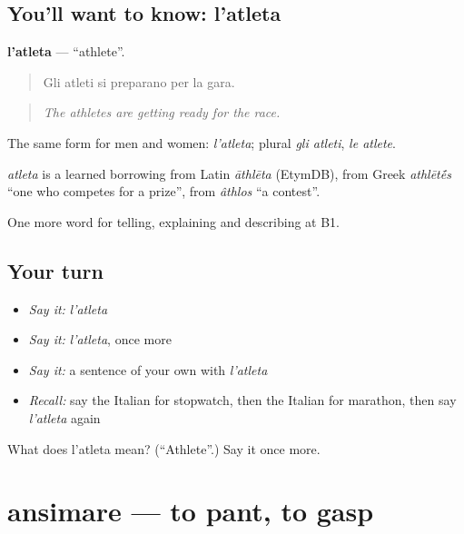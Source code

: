 \subsection*{You'll want to know: l'atleta}
\textbf{l'atleta} — \textquotedblleft{}athlete\textquotedblright{}.

\begin{quote}
Gli atleti si preparano per la gara.
\end{quote}

\begin{quote}
\emph{The athletes are getting ready for the race.}
\end{quote}

The same form for men and women: \emph{l'atleta}; plural \emph{gli atleti}, \emph{le atlete}.

\begin{cousinweb}
\emph{atleta} is a learned borrowing from Latin \emph{āthlēta} (EtymDB), from Greek \emph{athlēt\'{\={e}}s} \textquotedblleft{}one who competes for a prize\textquotedblright{}, from \emph{âthlos} \textquotedblleft{}a contest\textquotedblright{}.
\end{cousinweb}

\begin{grammarlens}[title={What you've built}]
One more word for telling, explaining and describing at B1.
\end{grammarlens}

\subsection*{Your turn}
\begin{itemize}
\raggedright
  \item \emph{Say it:} \emph{l'atleta}
  \item \emph{Say it:} \emph{l'atleta}, once more
  \item \emph{Say it:} a sentence of your own with \emph{l'atleta}
  \item \emph{Recall:} say the Italian for stopwatch, then the Italian for marathon, then say \emph{l'atleta} again
\end{itemize}

\begin{tcolorbox}[breakable,colback=teal!4,colframe=teal!35!black,title={Before you move on}]
What does l'atleta mean? (\textquotedblleft{}Athlete\textquotedblright{}.) Say it once more.
\end{tcolorbox}
\section[ansimare]{ansimare — to pant, to gasp}

